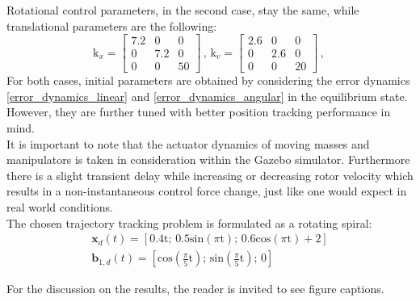 \noindent Rotational control parameters, in the second case, stay the same, while translational parameters are the following: 
\begin{equation*}
	\text{k}_x = 
	\begin{bmatrix}
		7.2 &  0  &  0 \\
		0 & 7.2  &	0 \\ 
		0 &  0  & 50 	
	\end{bmatrix}
	\, , \,	
	\text{k}_v =
	\begin{bmatrix}
		2.6 & 0 & 0 \\
		0 & 2.6 & 0 \\
		0 & 0 & 20
	\end{bmatrix}
	\, , \,
\end{equation*}
For both cases, initial parameters are obtained by considering the error dynamics \eqref{error_dynamics_linear} and \eqref{error_dynamics_angular} in the equilibrium state. However, they are further tuned with better position tracking performance in mind.\\
It is important to note that the actuator dynamics of moving masses and manipulators is taken in consideration within the Gazebo simulator. Furthermore there is a slight transient delay while increasing or decreasing rotor velocity which results in a non-instantaneous control force change, just like one would expect in real world conditions. \\
\indent The chosen trajectory tracking problem is formulated as a rotating spiral:
\begin{gather*}
	\textbf{x}_d(t) = [0.4\text{t}; \, 0.5\text{sin}(\pi\text{t}); \, 0.6\text{cos}(\pi\text{t}) + 2] \\
	\textbf{b}_{1,d}(t) = [\text{cos}\left(\frac{\pi}{5}\text{t}\right); \, \text{sin}\left(\frac{\pi}{5}\text{t}\right); \, 0]
\end{gather*}

For the discussion on the results, the reader is invited to see figure captions. 

